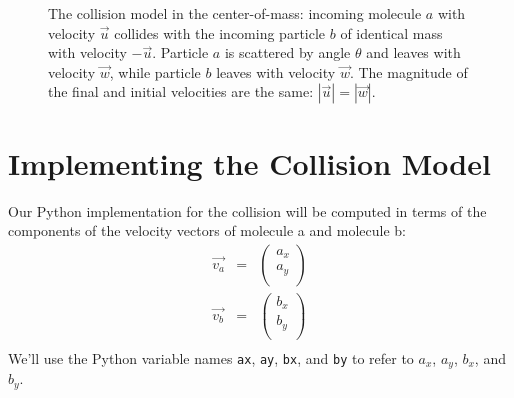 \begin{figure}[htbp]
\begin{center}
\caption{The collision model in the center-of-mass:  incoming molecule $a$ with velocity $\vec{u}$ collides with the incoming particle $b$ of identical mass with velocity $-\vec{u}$.  Particle $a$ is scattered by angle $\theta$ and leaves with velocity $\vec{w}$, while particle $b$ leaves with velocity $\vec{w}$.  The magnitude of the final and initial velocities are the same:  $|\vec{u}| = |\vec{w}|$.}
\label{fig:collcms}
\end{center}
\end{figure}

\section{Implementing the Collision Model}

Our Python implementation for the collision will be computed in terms
of the components of the velocity vectors of molecule a and molecule
b:
\begin{eqnarray*}
\vec{v_a} &=& 
\begin{pmatrix}
a_x \\
a_y \\
\end{pmatrix} \\
\vec{v_b} &=& 
\begin{pmatrix}
b_x \\
b_y \\
\end{pmatrix} \\
\end{eqnarray*}
We'll use the Python variable names {\tt ax}, {\tt ay}, {\tt bx}, and {\tt by} to refer to $a_x$,  $a_y$,  $b_x$, and $b_y$.  

